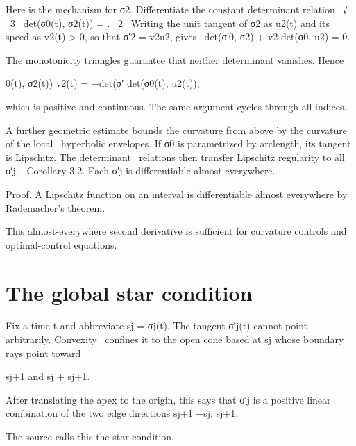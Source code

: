 \begin{displaytext}
Here is the mechanism for σ2. Differentiate the constant determinant relation \
√ \
3 \
det(σ0(t), σ2(t)) = . \
2 \
Writing the unit tangent of σ2 as u2(t) and its speed as v2(t) > 0, so that σ′2 = v2u2, gives \
det(σ′0, σ2) + v2 det(σ0, u2) = 0.
\end{displaytext}

The monotonicity triangles guarantee that neither determinant vanishes. Hence


\begin{displaytext}
0(t), σ2(t)) v2(t) = −det(σ′ det(σ0(t), u2(t)),
\end{displaytext}

which is positive and continuous. The same argument cycles through all indices.


\begin{displaytext}
A further geometric estimate bounds the curvature from above by the curvature of the local \
hyperbolic envelopes. If σ0 is parametrized by arclength, its tangent is Lipschitz. The determinant \
relations then transfer Lipschitz regularity to all σ′j. \
Corollary 3.2. Each σ′j is differentiable almost everywhere.
\end{displaytext}

\begin{prooftext}
Proof. A Lipschitz function on an interval is differentiable almost everywhere by Rademacher’s theorem.
\end{prooftext}

This almost-everywhere second derivative is sufficient for curvature controls and optimal-control equations.


\section{The global star condition}

\begin{displaytext}
Fix a time t and abbreviate sj = σj(t). The tangent σ′j(t) cannot point arbitrarily. Convexity \
confines it to the open cone based at sj whose boundary rays point toward
\end{displaytext}

sj+1 and sj + sj+1.


After translating the apex to the origin, this says that σ′j is a positive linear combination of the two edge directions sj+1 −sj, sj+1.


The source calls this the star condition.



